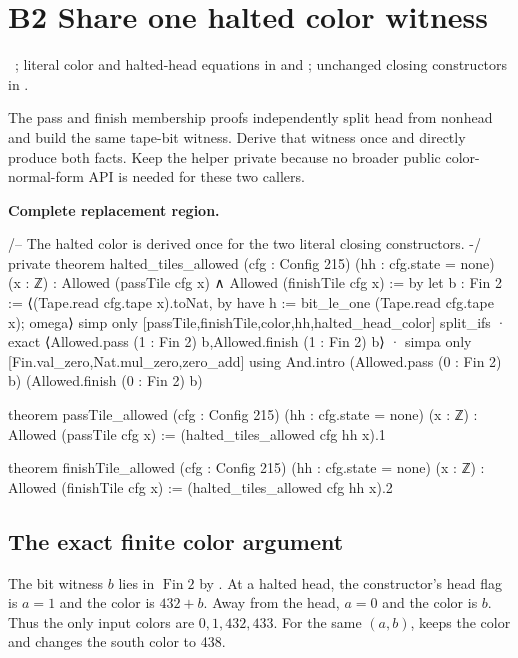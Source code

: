 \section{B2 Share one halted color witness}

\ ; literal color and halted-head equations in  and ; unchanged closing constructors in .

The pass and finish membership proofs independently split head from nonhead and build the same tape-bit witness. Derive that witness once and directly produce both  facts. Keep the helper private because no broader public color-normal-form API is needed for these two callers.

\textbf{Complete replacement region.}
\begin{Lean}
/-- The halted color is derived once for the two literal closing constructors. -/
private theorem halted_tiles_allowed (cfg : Config 215) (hh : cfg.state = none) (x : ℤ) :
    Allowed (passTile cfg x) ∧ Allowed (finishTile cfg x) := by
  let b : Fin 2 := ⟨(Tape.read cfg.tape x).toNat, by
    have h := bit_le_one (Tape.read cfg.tape x); omega⟩
  simp only [passTile,finishTile,color,hh,halted_head_color]
  split_ifs
  · exact ⟨Allowed.pass (1 : Fin 2) b,Allowed.finish (1 : Fin 2) b⟩
  · simpa only [Fin.val_zero,Nat.mul_zero,zero_add] using
      And.intro (Allowed.pass (0 : Fin 2) b) (Allowed.finish (0 : Fin 2) b)

theorem passTile_allowed (cfg : Config 215) (hh : cfg.state = none) (x : ℤ) :
    Allowed (passTile cfg x) := (halted_tiles_allowed cfg hh x).1

theorem finishTile_allowed (cfg : Config 215) (hh : cfg.state = none) (x : ℤ) :
    Allowed (finishTile cfg x) := (halted_tiles_allowed cfg hh x).2
\end{Lean}

\subsection{The exact finite color argument}
The bit witness $b$ lies in $\operatorname{Fin}2$ by . At a halted head, the constructor's head flag is $a=1$ and the color is $432+b$. Away from the head, $a=0$ and the color is $b$. Thus the only input colors are $0,1,432,433$. For the same $(a,b)$,  keeps the color and  changes the south color to 438.

